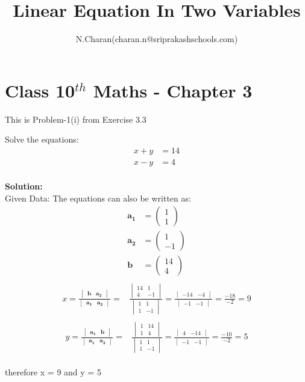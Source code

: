 \documentclass[12pt]{article}
\title{Linear Equation In Two Variables}
\author{N.Charan(charan.n@sriprakashschools.com)}
\newcommand{\myvec}[1]{\ensuremath{\begin{pmatrix}#1\end{pmatrix}}}
\newcommand{\mydet}[1]{\ensuremath{\begin{vmatrix}#1\end{vmatrix}}}
\newcommand{\solution}{\noindent \textbf{Solution: }}
\let\vec\mathbf
\begin{document}
\maketitle
\section*{Class 10$^{th}$ Maths - Chapter 3}
This is Problem-1(i) from Exercise 3.3
\item  Solve the equations:\\
\begin{align}
  x+y&=14\\x-y&=4 \\  
\end{align}

\solution \\
Given Data: 
The equations can also be written as:
\begin{align}
\vec{a_1} &=\myvec{1\\1} \\\vec{a_2}&= \myvec{1\\-1}\\\vec{b}&=\myvec{14\\4}
\end{align}
\begin{align}
\\x = \frac{\mydet{ \vec{b} & \vec{a_2}}}{\mydet{ \vec{a_1} & \vec{a_2}}} =&
\frac{\mydet{ 14 & 1\\ 4 & -1}}{\mydet{1&1\\1&-1}}= \frac{\mydet{ -14 &-4 }}{\mydet{ -1&-1 }}= \frac{-18}{-2}=9
\end{align}
\begin{align}
\\y = \frac{\mydet{ \vec{a_1} & \vec{b}}}{\mydet{ \vec{a_1} & \vec{a_2}}} =&
\frac{\mydet{ 1 & 14 \\ 1 & 4}}{\mydet{1&1\\1&-1}}=   \frac{\mydet{ 4 & -14}}{\mydet{ -1 & -1}} = \frac{-10}{-2}=5 
\end{align}
\\ therefore x = 9 and y = 5
\end{document}
